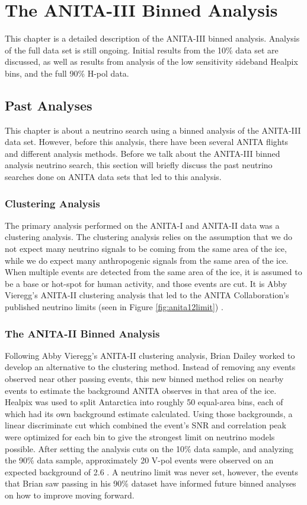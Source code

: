 \chapter{The ANITA-III Binned Analysis}

This chapter is a detailed description of the ANITA-III binned analysis.  Analysis of the full data set is still ongoing.  Initial results from the 10\% data set are discussed, as well as results from analysis of the low sensitivity sideband Healpix bins, and the full 90\% H-pol data. 

\section{Past Analyses}

This chapter is about a neutrino search using a binned analysis of the ANITA-III data set.  However, before this analysis, there have been several ANITA flights and different analysis methods.  Before we talk about the ANITA-III binned analysis neutrino search, this section will briefly discuss the past neutrino searches done on ANITA data sets that led to this analysis.

\subsection{Clustering Analysis}

The primary analysis performed on the ANITA-I and ANITA-II data was a clustering analysis.  The clustering analysis relies on the assumption that we do not expect many neutrino signals to be coming from the same area of the ice, while we do expect many anthropogenic signals from the same area of the ice.  When multiple events are detected from the same area of the ice, it is assumed to be a base or hot-spot for human activity, and those events are cut.  It is Abby Vieregg's ANITA-II clustering analysis that led to the ANITA Collaboration's published neutrino limits (seen in Figure \ref{fig:anita12limit}) \cite{abby}.  

\subsection{The ANITA-II Binned Analysis}

Following Abby Vieregg's ANITA-II clustering analysis, Brian Dailey worked to develop an alternative to the clustering method.  Instead of removing any events observed near other passing events, this new binned method relies on nearby events to estimate the background ANITA observes in that area of the ice.  Healpix was used to split Antarctica into roughly 50 equal-area bins, each of which had its own background estimate calculated.  Using those backgrounds, a linear discriminate cut which combined the event's SNR and correlation peak were optimized for each bin to give the strongest limit on neutrino models possible.   After setting the analysis cuts on the 10\% data sample, and analyzing the 90\% data sample, approximately 20 V-pol events were observed on an expected background of 2.6 \cite{brian}.  A neutrino limit was never set, however, the events that Brian saw passing in his 90\% dataset have informed future binned analyses on how to improve moving forward.

